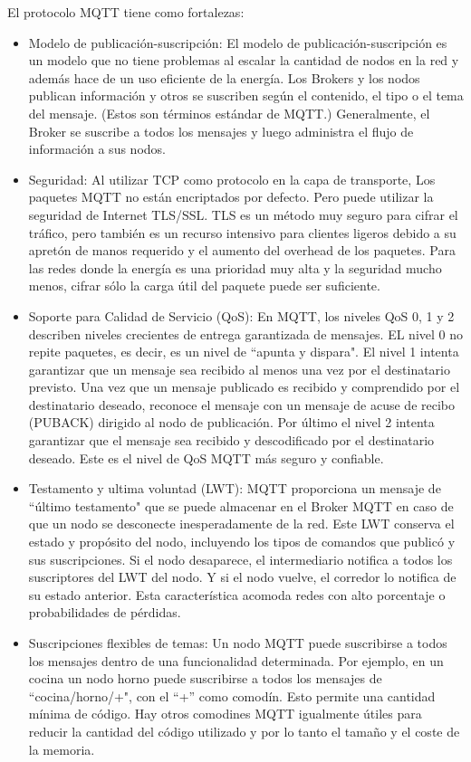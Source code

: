 El protocolo MQTT tiene como fortalezas:
\begin{itemize}
\item Modelo de publicación-suscripción: El modelo de publicación-suscripción es un modelo que no tiene problemas al escalar la cantidad de nodos en la red y además hace de un uso eficiente de la energía. Los Brokers y los nodos publican información y otros se suscriben según el contenido, el tipo o el tema del mensaje. (Estos son términos estándar de MQTT.) Generalmente, el Broker se suscribe a todos los mensajes y luego administra el flujo de información a sus nodos.
\item Seguridad: Al utilizar TCP como protocolo en la capa de transporte, Los paquetes MQTT no están encriptados por defecto. Pero puede utilizar la seguridad de Internet TLS/SSL. TLS es un método muy seguro para cifrar el tráfico, pero también es un recurso intensivo para clientes ligeros debido a su apretón de manos requerido y el aumento del overhead de los paquetes. Para las redes donde la energía es una prioridad muy alta y la seguridad mucho menos, cifrar sólo la carga útil del paquete puede ser suficiente.
\item Soporte para Calidad de Servicio (QoS): En MQTT, los niveles QoS 0, 1 y 2 describen niveles crecientes de entrega garantizada de mensajes. EL nivel 0 no repite paquetes, es decir, es un nivel de ``apunta y dispara". El nivel 1 intenta garantizar que un mensaje sea recibido al menos una vez por el destinatario previsto. Una vez que un mensaje publicado es recibido y comprendido por el destinatario deseado, reconoce el mensaje con un mensaje de acuse de recibo (PUBACK) dirigido al nodo de publicación. Por último el nivel 2 intenta garantizar que el mensaje sea recibido y descodificado por el destinatario deseado. Este es el nivel de QoS MQTT más seguro y confiable. 
\item Testamento y ultima voluntad (LWT): MQTT proporciona un mensaje de ``último testamento" que se puede almacenar en el Broker MQTT en caso de que un nodo se desconecte inesperadamente de la red. Este LWT conserva el estado y propósito del nodo, incluyendo los tipos de comandos que publicó y sus suscripciones. Si el nodo desaparece, el intermediario notifica a todos los suscriptores del LWT del nodo. Y si el nodo vuelve, el corredor lo notifica de su estado anterior. Esta característica acomoda redes con alto porcentaje o probabilidades de  pérdidas.
\item Suscripciones flexibles de temas: Un nodo MQTT puede suscribirse a todos los mensajes dentro de una funcionalidad determinada. Por ejemplo, en un cocina un nodo horno puede suscribirse a todos los mensajes de ``cocina/horno/+", con el ``+'' como comodín. Esto permite una cantidad mínima de código. Hay otros comodines MQTT igualmente útiles para reducir la cantidad del código utilizado y por lo tanto el tamaño y el coste de la memoria.
\end{itemize}

